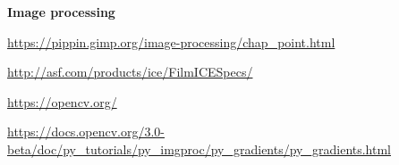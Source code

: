 \documentclass{article}
\begin{document}
\begin{thebibliography}{}
  \item[]\hspace{-\labelwidth}\hspace{-\labelsep}\textbf{Image processing}
  
  \url{https://pippin.gimp.org/image-processing/chap_point.html}
  
  \url{http://asf.com/products/ice/FilmICESpecs/}
  
  \url{https://opencv.org/}
  
  \url{https://docs.opencv.org/3.0-beta/doc/py_tutorials/py_imgproc/py_gradients/py_gradients.html}
\end{thebibliography}
\end{document}
